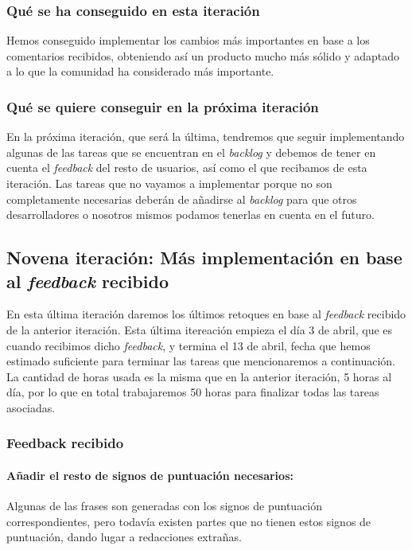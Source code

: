 \subsubsection{Qué se ha conseguido en esta iteración}

Hemos conseguido implementar los cambios más importantes en base a los comentarios recibidos, obteniendo así un producto mucho más sólido y adaptado a lo que la comunidad ha considerado más importante.

\subsubsection{Qué se quiere conseguir en la próxima iteración}

En la próxima iteración, que será la última, tendremos que seguir implementando algunas de las tareas que se encuentran en el \textit{backlog} y debemos de tener en cuenta el \textit{feedback} del resto de usuarios, así como el que recibamos de esta iteración.
Las tareas que no vayamos a implementar porque no son completamente necesarias deberán de añadirse al \textit{backlog} para que otros desarrolladores o nosotros mismos podamos tenerlas en cuenta en el futuro.

\subsection{Novena iteración: Más implementación en base al \textit{feedback} recibido}

En esta última iteración daremos los últimos retoques en base al \textit{feedback} recibido de la anterior iteración. Esta última itereación empieza el día 3 de abril, que es cuando recibimos dicho \textit{feedback}, y termina el 13 de abril, fecha que hemos estimado suficiente para terminar las tareas que mencionaremos a continuación. La cantidad de horas usada es la misma que en la anterior iteración, 5 horas al día, por lo que en total trabajaremos 50 horas para finalizar todas las tareas asociadas.

\subsubsection{Feedback recibido}

\paragraph{Añadir el resto de signos de puntuación necesarios:} Algunas de las frases son generadas con los signos de puntuación correspondientes, pero todavía existen partes que no tienen estos signos de puntuación, dando lugar a redacciones extrañas.

